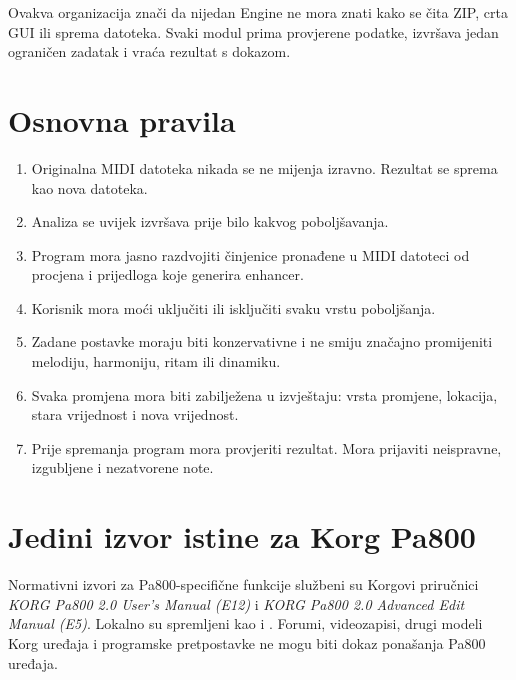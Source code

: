\documentclass[11pt]{article}
\begin{document}
Ovakva organizacija znači da nijedan Engine ne mora znati kako se čita ZIP,
crta GUI ili sprema datoteka. Svaki modul prima provjerene podatke, izvršava
jedan ograničen zadatak i vraća rezultat s dokazom.

\section{Osnovna pravila}

\begin{enumerate}[label=R\arabic*.]
    \item Originalna MIDI datoteka nikada se ne mijenja izravno.
    Rezultat se sprema kao nova datoteka.

    \item Analiza se uvijek izvršava prije bilo kakvog poboljšavanja.

    \item Program mora jasno razdvojiti činjenice pronađene u MIDI datoteci od
    procjena i prijedloga koje generira enhancer.

    \item Korisnik mora moći uključiti ili isključiti svaku vrstu poboljšanja.

    \item Zadane postavke moraju biti konzervativne i ne smiju značajno
    promijeniti melodiju, harmoniju, ritam ili dinamiku.

    \item Svaka promjena mora biti zabilježena u izvještaju: vrsta promjene,
    lokacija, stara vrijednost i nova vrijednost.

    \item Prije spremanja program mora provjeriti rezultat. Mora prijaviti
    neispravne, izgubljene i nezatvorene note.
\end{enumerate}

\section{Jedini izvor istine za Korg Pa800}

Normativni izvori za Pa800-specifične funkcije službeni su Korgovi priručnici
\emph{KORG Pa800 2.0 User's Manual (E12)} i \emph{KORG Pa800 2.0 Advanced Edit
Manual (E5)}. Lokalno su spremljeni kao
 i
. Forumi,
videozapisi, drugi modeli Korg uređaja i programske pretpostavke ne mogu biti
dokaz ponašanja Pa800 uređaja.
\end{document}
